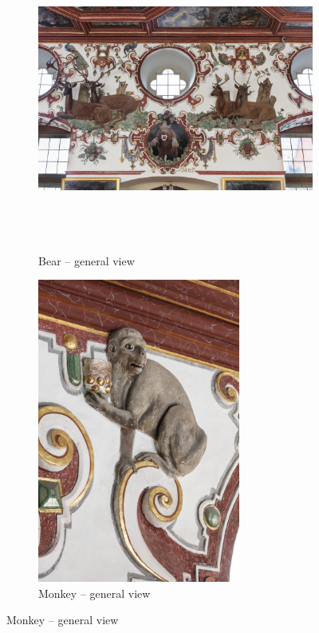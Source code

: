 \documentclass[
  a4paper,
]{book}
\begin{document}
\begin{figure}
\clearpage

\begin{figure}[H]    
  \includegraphics[height=10cm]{images/fmd10005865a.jpg}
  \caption{Bear – general view}
  \label{fig:{images/fmd10005865a.jpg}}
\end{figure}

\clearpage

\begin{figure}[H]    
  \includegraphics[height=10cm]{images/fmd10005867a.jpg}
  \caption{Monkey – general view}
  \label{fig:{images/fmd10005867a.jpg}}
\end{figure}

\clearpage


\end{figure}
\end{document}
